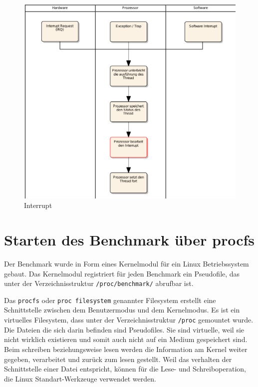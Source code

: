 \begin{figure}[H]
\centering
\includegraphics[width=1.0\textwidth]{images/interrupt_ea.pdf}
\caption{Interrupt}
\label{fig:Interrupt}
\end{figure}

\section{Starten des Benchmark über procfs}

Der Benchmark wurde in Form eines Kernelmodul für ein Linux Betriebssystem gebaut. Das Kernelmodul registriert für jeden Benchmark ein Pseudofile, das unter der Verzeichnisstruktur \texttt{/proc/benchmark/} abrufbar ist.
\par
Das \texttt{procfs} oder \texttt{proc filesystem} genannter Filesystem erstellt eine Schnittstelle zwischen dem Benutzermodus und dem Kernelmodus. Es ist ein virtuelles Filesystem, dass unter der Verzeichnisstruktur \texttt{/proc} gemountet wurde\cite{mauerer2010professional}. Die Dateien die sich darin befinden sind Pseudofiles. Sie sind virtuelle, weil sie nicht wirklich existieren und somit auch nicht auf ein Medium gespeichert sind. Beim schreiben beziehungsweise lesen werden die Information am Kernel weiter gegeben, verarbeitet und zurück zum lesen gestellt. Weil das verhalten der Schnittstelle einer Datei entspricht, können für die Lese- und Schreiboperation, die Linux Standart-Werkzeuge verwendet werden.

